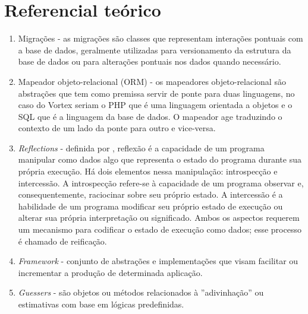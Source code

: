 \section{Referencial teórico}
\begin{enumerate}
    \item\label{rt_migrations} Migrações - as migrações são classes que representam interações pontuais com a base de dados, geralmente utilizadas para versionamento da estrutura da base de dados ou para alterações pontuais nos dados quando necessário.
    \item\label{rt_orm} Mapeador objeto-relacional (ORM) - os mapeadores objeto-relacional são abstrações que tem como premissa servir de ponte para duas linguagens, no caso do Vortex seriam o PHP que é uma linguagem orientada a objetos e o SQL que é a linguagem da base de dados. O mapeador age traduzindo o contexto de um lado da ponte para outro e vice-versa.
    \item\label{rt_reflections} \textit{Reflections} -   definida por \cite{gabriel1991clos}, reflexão é a capacidade de um programa manipular como dados algo que representa o estado do programa durante sua própria execução. Há dois elementos nessa manipulação: introspecção e intercessão. A introspecção refere-se à capacidade de um programa observar e, consequentemente, raciocinar sobre seu próprio estado. A intercessão é a habilidade de um programa modificar seu próprio estado de execução ou alterar sua própria interpretação ou significado. Ambos os aspectos requerem um mecanismo para codificar o estado de execução como dados; esse processo é chamado de reificação.
    \item\label{rt_framework} \textit{Framework} - conjunto de abstrações e implementações que visam facilitar ou incrementar a produção de determinada aplicação.
    \item\label{rt_guessers} \textit{Guessers} - são objetos ou métodos relacionados à ''adivinhação'' ou estimativas com base em lógicas predefinidas.
\end{enumerate}